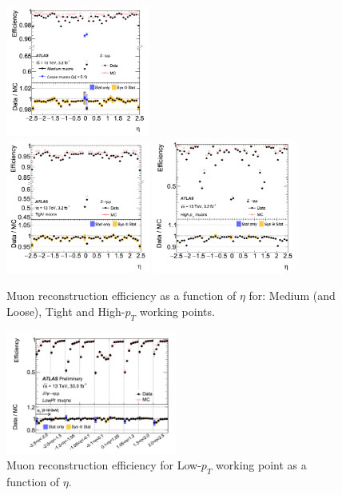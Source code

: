 \begin{figure}[!htb]
  \centering
  \includegraphics[width=0.42\textwidth]{figures/Simulation/muon_id_med.png} \\
  \includegraphics[width=0.42\textwidth]{figures/Simulation/muon_id_tight.png}
  \includegraphics[width=0.42\textwidth]{figures/Simulation/muon_id_highpT.png}
  \caption{Muon reconstruction efficiency as a function of $\eta$ for: Medium (and Loose), Tight and High-$p_{T}$ working points.}
  \label{fig:muon_id_eff}
\end{figure}

\begin{figure}[!htb]
  \centering
  \includegraphics[width=0.5\textwidth]{figures/Simulation/muon_id_lowpT.png}
  \caption{Muon reconstruction efficiency for Low-$p_{T}$ working point as a function of $\eta$.}
  \label{fig:muon_id_lowpt}
\end{figure}


